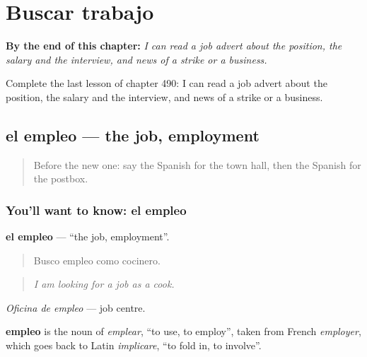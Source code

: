 
\chapter{Buscar trabajo}
\label{ch:es-buscar-trabajo}

\begin{chapteropening}
\textbf{By the end of this chapter:} \emph{I can read a job advert about the position, the salary and the interview, and news of a strike or a business.}

Complete the last lesson of chapter 490: I can read a job advert about the position, the salary and the interview, and news of a strike or a business.
\end{chapteropening}

\section[el empleo]{el empleo — the job, employment}

\label{lesson:ES-C490-empleo}



\begin{quote}
Before the new one: say the Spanish for the town hall, then the Spanish for the postbox.
\end{quote}

\subsection*{You'll want to know: el empleo}
\textbf{el empleo} — \textquotedblleft{}the job, employment\textquotedblright{}.

\begin{quote}
Busco empleo como cocinero.
\end{quote}

\begin{quote}
\emph{I am looking for a job as a cook.}
\end{quote}

\emph{Oficina de empleo} — job centre.

\begin{cousinweb}
\textbf{empleo} is the noun of \emph{emplear}, \textquotedblleft{}to use, to employ\textquotedblright{}, taken from French \emph{employer}, which goes back to Latin \emph{implicare}, \textquotedblleft{}to fold in, to involve\textquotedblright{}.
\end{cousinweb}

